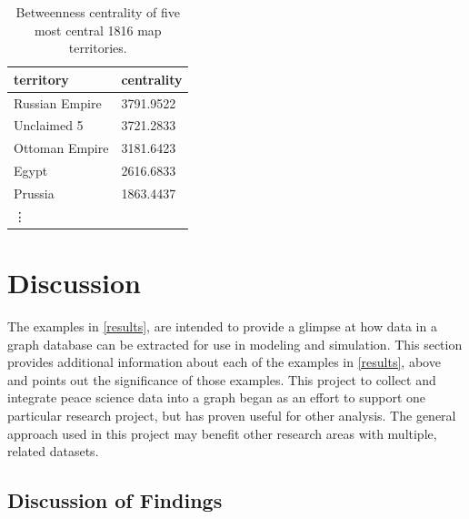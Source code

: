 \documentclass[runningheads]{llncs}
\begin{document}
\begin{table}[]
\begin{center}
\caption{Betweenness centrality of five most central 1816 map territories.}\label{tab2}
\begin{tabular}{l|l}
\hline
territory & centrality \\
\hline
Russian Empire & 3791.9522 \\
Unclaimed 5 & 3721.2833 \\
Ottoman Empire & 3181.6423 \\
Egypt & 2616.6833 \\
Prussia & 1863.4437 \\
\vdots & \\
\hline
\end{tabular}
\end{center}
\end{table}

\section{Discussion\label{discussion}}
%
The examples in \ref{results}, are intended to provide a glimpse at how data in a graph database can be extracted for use in modeling and simulation.
This section provides additional information about each of the examples in \ref{results}, above and points out the significance of those examples.
This project to collect and integrate peace science data into a graph began as an effort to support one particular research project, but has proven useful for other analysis.
The general approach used in this project may benefit other research areas with multiple, related datasets.

\subsection{Discussion of Findings}
\end{document}
